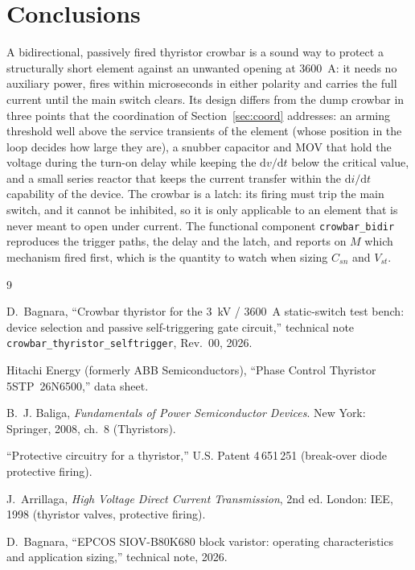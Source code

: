 \documentclass[11pt,a4paper]{article}
\begin{document}
\section{Conclusions}

A bidirectional, passively fired thyristor crowbar is a sound way to protect a structurally
short element against an unwanted opening at \SI{3600}{A}: it needs no auxiliary power, fires
within microseconds in either polarity and carries the full current until the main switch
clears. Its design differs from the dump crowbar in three points that the coordination of
Section~\ref{sec:coord} addresses: an arming threshold well above the service transients of the
element (whose position in the loop decides how large they are), a snubber capacitor and MOV
that hold the voltage during the turn-on delay while keeping the $\mathrm{d}v/\mathrm{d}t$ below
the critical value, and a small series reactor that keeps the current transfer within the
$\mathrm{d}i/\mathrm{d}t$ capability of the device. The crowbar is a latch: its firing must trip
the main switch, and it cannot be inhibited, so it is only applicable to an element that is
never meant to open under current. The functional component \texttt{crowbar\_bidir} reproduces
the trigger paths, the delay and the latch, and reports on $M$ which mechanism fired first,
which is the quantity to watch when sizing $C_{sn}$ and $V_{st}$.

\begin{thebibliography}{9}

D.~Bagnara, ``Crowbar thyristor for the 3~kV / 3600~A static-switch test bench: device selection
and passive self-triggering gate circuit,'' technical note \texttt{crowbar\_thyristor\_selftrigger},
Rev.~00, 2026.

Hitachi Energy (formerly ABB Semiconductors), ``Phase Control Thyristor 5STP~26N6500,'' data sheet.

B.~J. Baliga, \emph{Fundamentals of Power Semiconductor Devices}. New York: Springer, 2008,
ch.~8 (Thyristors).

``Protective circuitry for a thyristor,'' U.S. Patent 4\,651\,251 (break-over diode protective firing).

J.~Arrillaga, \emph{High Voltage Direct Current Transmission}, 2nd ed. London: IEE, 1998
(thyristor valves, protective firing).

D.~Bagnara, ``EPCOS SIOV-B80K680 block varistor: operating characteristics and application
sizing,'' technical note, 2026.

\end{thebibliography}
\end{document}

